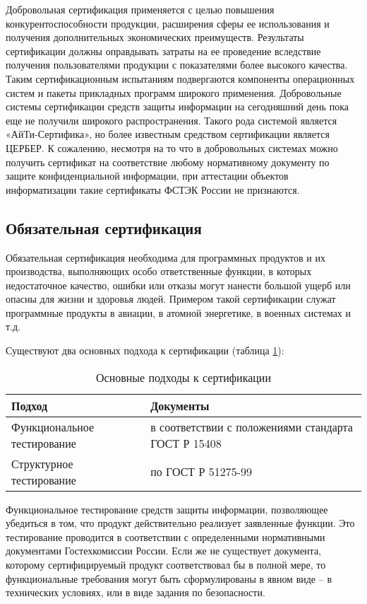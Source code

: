 Добровольная сертификация применяется с целью повышения конкурентоспособности продукции, расширения сферы ее использования и получения дополнительных экономических преимуществ. Результаты сертификации должны оправдывать затраты на ее проведение вследствие получения пользователями продукции с показателями более высокого качества. Таким сертификационным испытаниям подвергаются компоненты операционных систем и пакеты прикладных программ широкого применения. Добровольные системы сертификации средств защиты информации на сегодняшний день пока еще не получили широкого распространения. Такого рода системой является «АйТи-Сертифика», но более известным средством сертификации является ЦЕРБЕР. К сожалению, несмотря на то что в добровольных системах можно получить сертификат на соответствие любому нормативному документу по защите конфиденциальной информации, при аттестации объектов информатизации такие сертификаты ФСТЭК России не признаются.

\subsection{Обязательная сертификация}

Обязательная сертификация необходима для программных продуктов и их производства, выполняющих особо ответственные функции, в которых недостаточное качество, ошибки или отказы могут нанести большой ущерб или опасны для жизни и здоровья людей. Примером такой сертификации служат программные продукты в авиации, в атомной энергетике, в военных системах и т.д.

Существуют два основных подхода к сертификации (таблица \ref{tab:sertif}):

\begin{table}[h!]
\caption{Основные подходы к сертификации}
\label{tab:sertif}
\begin{tabularx}{\linewidth}{|l|X|}
\hline
Подход & Документы\\ 
\hline
Функциональное тестирование & в соответствии с положениями стандарта ГОСТ Р 15408\\ 
\hline
Структурное тестирование & по ГОСТ Р 51275-99 \\ 
\hline
\end{tabularx}
\end{table}

Функциональное тестирование средств защиты информации, позволяющее убедиться в том, что продукт действительно реализует заявленные функции. Это тестирование проводится в соответствии с определенными нормативными документами Гостехкомиссии России. Если же не существует документа, которому сертифицируемый продукт соответствовал бы в полной мере, то функциональные требования могут быть сформулированы в явном виде – в технических условиях, или в виде задания по безопасности.

